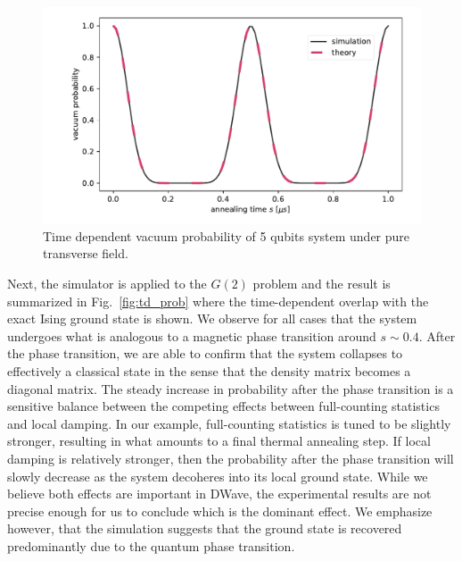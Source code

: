 \documentclass[prd,twocolumn,tightenlines,preprintnumbers,showpacs,superscriptaddress,notitlepage,nofootinbib,eqsecnum,floatfix,longbibliography,aps,10pt]{revtex4-2}
\begin{document}
\begin{figure}
	\centering
	\includegraphics[width=\columnwidth]{./new_figures/vacuum_probability.pdf}
	\caption{Time dependent vacuum probability of 5 qubits system under pure transverse field.}
	\label{figcheck}
\end{figure}

Next, the simulator is applied to the $G(2)$ problem and the result is summarized in Fig.~\ref{fig:td_prob} where the time-dependent overlap with the exact Ising ground state is shown. We observe for all cases that the system undergoes what is analogous to a magnetic phase transition around $s\sim 0.4$.
After the phase transition, we are able to confirm that the system collapses to effectively a classical state in the sense that the density matrix becomes a diagonal matrix.
The steady increase in probability after the phase transition is a sensitive balance between the competing effects between full-counting statistics and local damping.
In our example, full-counting statistics is tuned to be slightly stronger, resulting in what amounts to a final thermal annealing step.
If local damping is relatively stronger, then the probability after the phase transition will slowly decrease as the system decoheres into its local ground state.
While we believe both effects are important in DWave, the experimental results are not precise enough for us to conclude which is the dominant effect.
We emphasize however, that the simulation suggests that the ground state is recovered predominantly due to the quantum phase transition.
\end{document}
